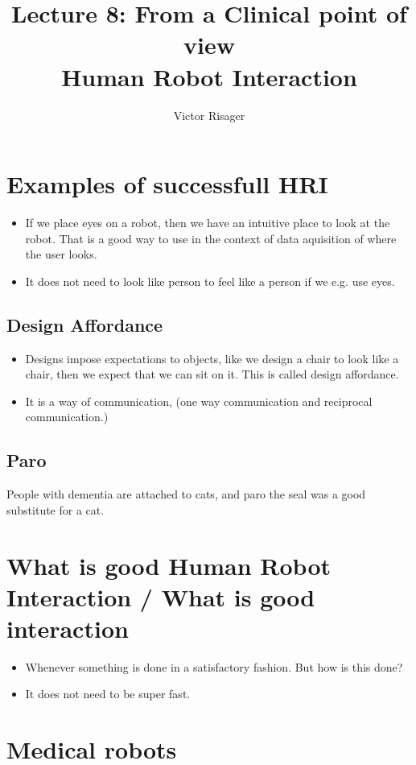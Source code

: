 \documentclass[a4paper]{article}
\title{Lecture 8: From a Clinical point of view  \\
	\large Human Robot Interaction}
\author{Victor Risager}
\begin{document}
\maketitle

\section{Examples of successfull HRI}
\begin{itemize}
	\item If we place eyes on a robot, then we have an intuitive place to look at the robot. That is a good way to use in the context of data aquisition of where the user looks.
	\item It does not need to look like person to feel like a person if we e.g. use eyes. 
\end{itemize}
\subsection{Design Affordance}
\begin{itemize}
	\item Designs impose expectations to objects, like we design a chair to look like a chair, then we expect that we can sit on it. This is called design affordance. 
	\item It is a way of communication, (one way communication and reciprocal communication.)
\end{itemize}

\subsection{Paro}
People with dementia are attached to cats, and paro the seal was a good substitute for a cat. 


\section{What is good Human Robot Interaction / What is good interaction}
\begin{itemize}
	\item Whenever something is done in a satisfactory fashion. But how is this done?
	\item It does not need to be super fast.
\end{itemize}

\section{Medical robots}
\end{document}
